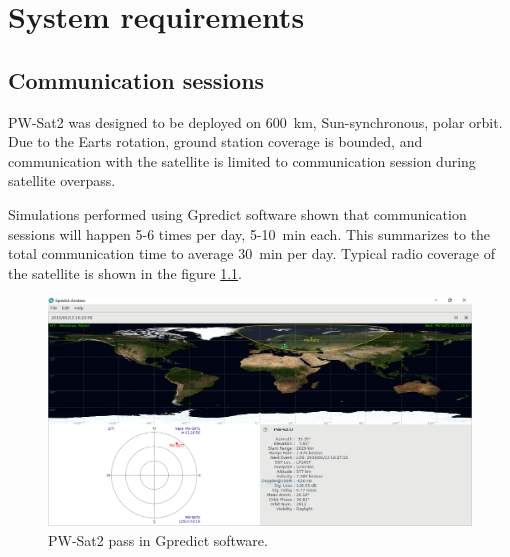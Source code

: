 

\chapter{System requirements}
\section{Communication sessions}
PW-Sat2 was designed to be deployed on \SI{600}{\kilo\meter}, Sun-synchronous, polar orbit. Due to the Earts rotation, ground station coverage is bounded, and communication with the satellite is limited to communication session during satellite overpass.

Simulations performed using Gpredict software \cite{gpredict_website} shown that communication sessions will happen \si{5}-\si{6} times per day, \si{5}-\SI{10}{\minute} each. This summarizes to the total communication time to average \SI{30}{\minute} per day. Typical radio coverage of the satellite is shown in the figure \ref{gpredict_pass}.

\begin{figure}
    \centering
    \includegraphics[width=0.8\paperwidth]{img/5/gpredict_pass.png}
    \caption{PW-Sat2 pass in Gpredict software.}
    \label{gpredict_pass}
\end{figure}


